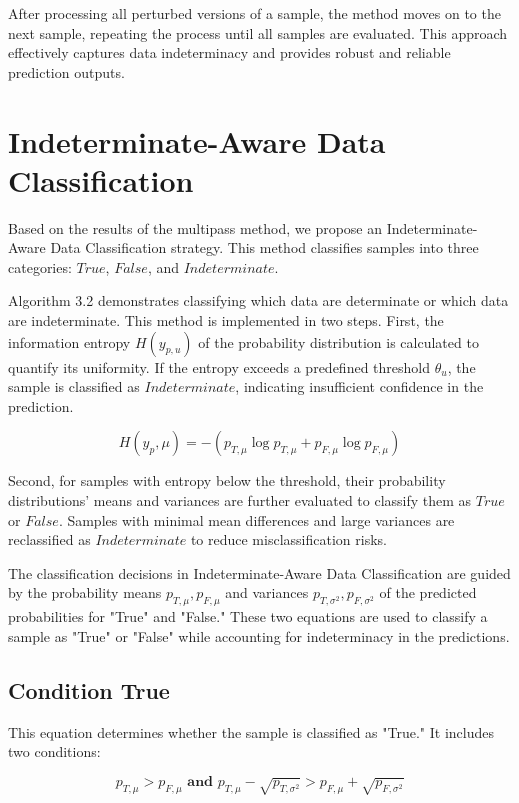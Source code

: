 After processing all perturbed versions of a sample, the method moves on to the next sample, repeating the process until all samples are evaluated. This approach effectively captures data indeterminacy and provides robust and reliable prediction outputs.

\section{Indeterminate-Aware Data Classification}%
Based on the results of the multipass method, we propose an Indeterminate-Aware Data Classification strategy. This method classifies samples into three categories: $True$, $False$, and $Indeterminate$.

Algorithm 3.2 demonstrates classifying which data are determinate or which data are indeterminate. This method is implemented in two steps. First, the information entropy $H(y_{p,u})$ of the probability distribution is calculated to quantify its uniformity. If the entropy exceeds a predefined threshold $\theta_{u}$, the sample is classified as $Indeterminate$, indicating insufficient confidence in the prediction.

\begin{equation}
H(y_p,\mu) = -(p_{T,\mu}\log p_{T,\mu}+p_{F,\mu}\log p_{F,\mu})
\end{equation}

Second, for samples with entropy below the threshold, their probability distributions' means and variances are further evaluated to classify them as $True$ or $False$. Samples with minimal mean differences and large variances are reclassified as $Indeterminate$ to reduce misclassification risks.

The classification decisions in Indeterminate-Aware Data Classification are guided by the probability means \(p_{T,\mu},p_{F,\mu}\) and variances \(p_{T,\sigma^2},p_{F,\sigma^2}\) of the predicted probabilities for "True" and "False." These two equations are used to classify a sample as "True" or "False" while accounting for indeterminacy in the predictions.

\subsection{Condition True}

This equation determines whether the sample is classified as "True." It includes two conditions:

\begin{equation}
p_{T,\mu} > p_{F,\mu} \textbf{ and } p_{T,\mu} - \sqrt{p_{T,\sigma^2}} > p_{F,\mu} + \sqrt{p_{F,\sigma^2}}
\end{equation}

